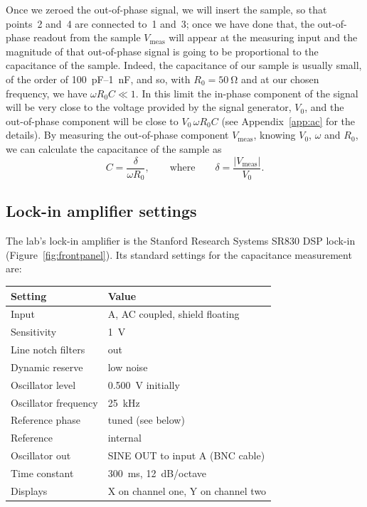 \documentclass[11pt,a4paper]{article}
\begin{document}
Once we zeroed the out-of-phase signal, we will insert the sample, so that
points~2 and~4 are connected to~1 and~3; once we have done that, the out-of-phase
readout from the sample $V_{\mathrm{meas}}$ will appear at the measuring input
and the magnitude of that out-of-phase signal is going to be proportional to the
capacitance of the sample. Indeed, the capacitance of our sample is usually
small, of the order of \SI{100}{\pico\farad}--\SI{1}{\nano\farad}, and so, with
$R_0 = \SI{50}{\ohm}$ and at our chosen frequency, we have $\omega R_0 C \ll 1$.
In this limit the in-phase component of the signal will be very close to the
voltage provided by the signal generator, $V_0$, and the out-of-phase component
will be close to $V_0\,\omega R_0 C$ (see Appendix~\ref{app:ac} for the details).
By measuring the out-of-phase component $V_{\mathrm{meas}}$, knowing $V_0$,
$\omega$ and $R_0$, we can calculate the capacitance of the sample as
\begin{equation}\label{eq:Csimple}
  C = \frac{\delta}{\omega R_0},
  \qquad\text{where}\qquad
  \delta = \frac{|V_{\mathrm{meas}}|}{V_0}.
\end{equation}

\subsection{Lock-in amplifier settings}\label{sec:lockinsettings}

The lab's lock-in amplifier is the Stanford Research Systems SR830 DSP
lock-in (Figure~\ref{fig:frontpanel}). Its standard settings for the
capacitance measurement are:

\begin{center}
\begin{tabular}{@{}ll@{}}
  \toprule
  \textbf{Setting} & \textbf{Value} \\
  \midrule
  Input            & A, AC coupled, shield floating \\
  Sensitivity      & \SI{1}{\volt} \\
  Line notch filters & out \\
  Dynamic reserve  & low noise \\
  Oscillator level & \SI{0.500}{\volt} initially \\
  Oscillator frequency & \SI{25}{\kilo\hertz} \\
  Reference phase  & tuned (see below) \\
  Reference        & internal \\
  Oscillator out   & SINE OUT to input A (BNC cable) \\
  Time constant    & \SI{300}{\milli\second}, \SI{12}{\deci\bel}/octave \\
  Displays         & X on channel one, Y on channel two \\
  \bottomrule
\end{tabular}
\end{center}
\end{document}
